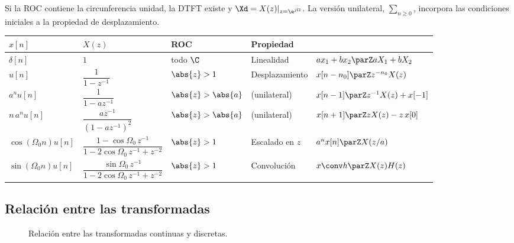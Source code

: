 \documentclass[11pt,a4paper]{scrartcl}
\begin{document}
Si la ROC contiene la circunferencia unidad, la DTFT existe y $\Xd=X(z)|_{z=\e^{j\Omega}}$. La versión unilateral, $\sum_{n\ge0}$, incorpora las condiciones iniciales a la propiedad de desplazamiento.

\begin{center}
  \small
  \renewcommand{\arraystretch}{1.3}
  \begin{tabular}{@{}lll@{\qquad}ll@{}}
    \toprule
    $x[n]$ & $X(z)$ & ROC & Propiedad & \\\midrule
    $\delta[n]$ & $1$ & todo $\C$ & Linealidad & $a x_1+b x_2\parZ aX_1+bX_2$\\
    $u[n]$ & $\dfrac{1}{1-z^{-1}}$ & $\abs{z}>1$ & Desplazamiento & $x[n-n_0]\parZ z^{-n_0}X(z)$\\
    $a^nu[n]$ & $\dfrac{1}{1-az^{-1}}$ & $\abs{z}>\abs{a}$ & \quad (unilateral) & $x[n-1]\parZ z^{-1}X(z)+x[-1]$\\
    $n\,a^nu[n]$ & $\dfrac{az^{-1}}{(1-az^{-1})^2}$ & $\abs{z}>\abs{a}$ & \quad (unilateral) & $x[n+1]\parZ zX(z)-z\,x[0]$\\
    $\cos(\Omega_0n)u[n]$ & $\dfrac{1-\cos\Omega_0\,z^{-1}}{1-2\cos\Omega_0\,z^{-1}+z^{-2}}$ & $\abs{z}>1$ & Escalado en $z$ & $a^nx[n]\parZ X(z/a)$\\
    $\sin(\Omega_0n)u[n]$ & $\dfrac{\sin\Omega_0\,z^{-1}}{1-2\cos\Omega_0\,z^{-1}+z^{-2}}$ & $\abs{z}>1$ & Convolución & $x\conv h\parZ X(z)H(z)$\\\bottomrule
  \end{tabular}
\end{center}

\subsection{Relación entre las transformadas}

\begin{figure}[ht]
  \centering
  \caption{Relación entre las transformadas continuas y discretas.}
\end{figure}
\end{document}
